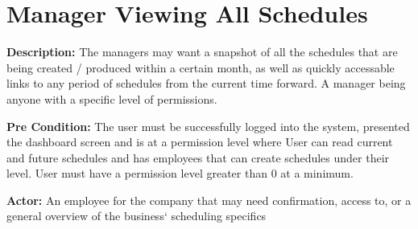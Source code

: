 \documentclass[letterpaper,12pt]{report}
\begin{document}
\section{Manager Viewing All Schedules}
\begin{description}
 \item \textbf{Description:} \newline The managers may want a snapshot of all the schedules that are being created / produced within a certain month, as well as quickly accessable links to any period of schedules from the current time forward.
A manager being anyone with a specific level of permissions.
 \item \textbf{Pre Condition:} \newline The user must be successfully logged into the system, presented the dashboard screen and is at a permission level where User can read current and future schedules and has employees that can create schedules under their level. User must have a permission level greater than 0 at a minimum.
 \item \textbf{Actor:} \newline An employee for the company that may need confirmation, access to, or a general overview of the business` scheduling specifics
\end{description}
\end{document}
